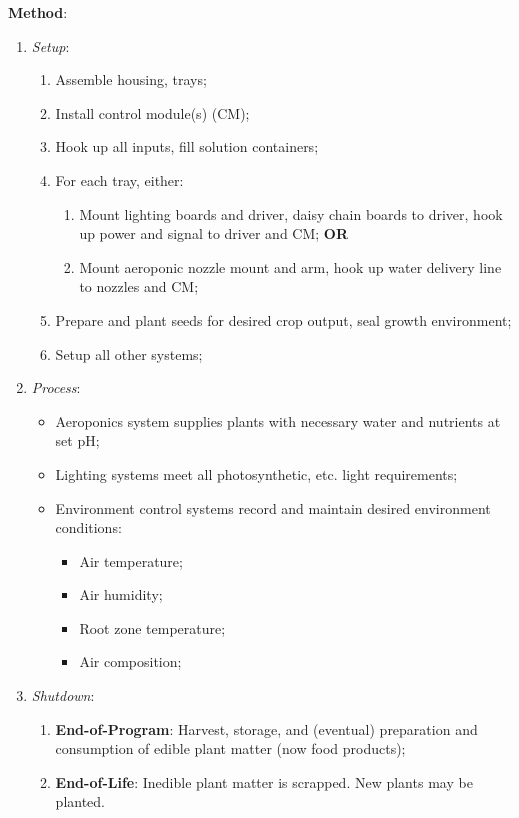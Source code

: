 \documentclass{report}
\begin{document}
\textbf{Method}:
\begin{enumerate}
    \item \textit{Setup}:
    \begin{enumerate}
        \item Assemble housing, trays;
        \item Install control module(s) (CM);
        \item Hook up all inputs, fill solution containers;
        \item For each tray, either:
        \begin{enumerate}
            \item Mount lighting boards and driver, daisy chain boards to driver, hook up power and signal to driver and CM; \textbf{OR}
            \item Mount aeroponic nozzle mount and arm, hook up water delivery line to nozzles and CM;
        \end{enumerate}
        \item Prepare and plant seeds for desired crop output, seal growth environment;
        \item Setup all other systems;
    \end{enumerate}
    \item \textit{Process}:
    \begin{itemize}
        \item Aeroponics system supplies plants with necessary water and nutrients at set pH;
        \item Lighting systems meet all photosynthetic, etc. light requirements;
        \item Environment control systems record and maintain desired environment conditions:
        \begin{itemize}
            \item Air temperature;
            \item Air humidity;
            \item Root zone temperature;
            \item Air composition;
        \end{itemize}
    \end{itemize}
    \item \textit{Shutdown}:
    \begin{enumerate}
        \item \textbf{End-of-Program}: Harvest, storage, and (eventual) preparation and consumption of edible plant matter (now food products);
        \item \textbf{End-of-Life}: Inedible plant matter is scrapped. New plants may be planted.
    \end{enumerate}
\end{enumerate}
\end{document}
